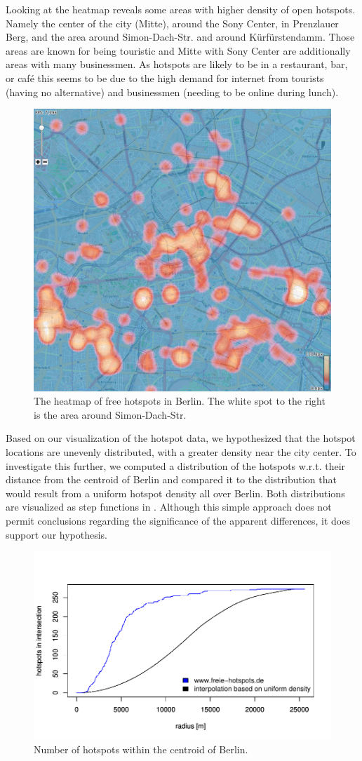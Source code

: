 Looking at the heatmap reveals some areas with higher density of open hotspots.
Namely the center of the city (Mitte), around the Sony Center,
in Prenzlauer Berg, and the area around Simon-Dach-Str.
and around Kürfürstendamm.
Those areas are known for being touristic and Mitte with Sony Center are additionally
areas with many businessmen.
As hotspots are likely to be in a restaurant, bar, or caf\'{e}
this seems to be due to the high demand for internet
from tourists (having no alternative) and businessmen (needing to
be online during lunch).
\begin{figure}
\centering
\includegraphics[width=0.45\linewidth]{imgs/heat}
\caption{The heatmap of free hotspots in Berlin.
The white spot to the right is the area around Simon-Dach-Str.}
\label{fig:heat}
\end{figure}
Based on our visualization of the hotspot data, we hypothesized that the hotspot locations
are unevenly distributed, with a greater density near the city center.
To investigate this further, we computed a distribution of the hotspots w.r.t. their
distance from the centroid of Berlin and compared it to the distribution that would
result from a uniform hotspot density all over Berlin. Both distributions are visualized
as step functions in . Although this simple approach does
not permit conclusions regarding the significance of the apparent differences,
it does support our hypothesis.
\begin{figure}[h]
	\centering
	\includegraphics[scale=0.35]{imgs/wifi_distributions.pdf}
	\caption{Number of hotspots within the centroid of Berlin.}
	\label{fig:wifi_distributions}
\end{figure}
